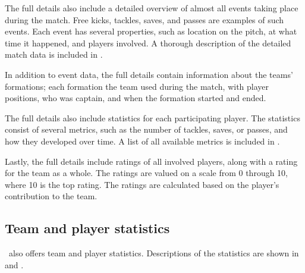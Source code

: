 The full details also include a detailed overview of almost all events taking place during the match. Free kicks, tackles, saves, and passes are examples of such events. Each event has several properties, such as location on the pitch, at what time it happened, and players involved. A thorough description of the detailed match data is included in .

In addition to event data, the full details contain information about the teams' formations; each formation the team used during the match, with player positions, who was captain, and when the formation started and ended.

The full details also include statistics for each participating player. The statistics consist of several metrics, such as the number of tackles, saves, or passes, and how they developed over time. A list of all available metrics is included in .

Lastly, the full details include ratings of all involved players, along with a rating for the team as a whole. The ratings are valued on a scale from 0 through 10, where 10 is the top rating. The ratings are calculated based on the player's contribution to the team.


\subsection{Team and player statistics}

\whoscored\ also offers team and player statistics. Descriptions of the statistics are shown in  and .